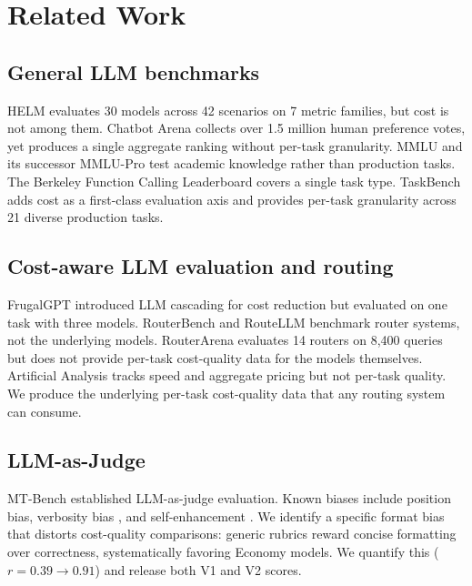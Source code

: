 \documentclass[11pt]{article}
\begin{document}
\section{Related Work}

\subsection{General LLM benchmarks}

HELM \citep{liang2023helm} evaluates 30 models across 42 scenarios on
7 metric families, but cost is not among them.  Chatbot Arena
\citep{chiang2024chatbot} collects over 1.5 million human preference
votes, yet produces a single aggregate ranking without per-task
granularity.  MMLU \citep{hendrycks2021mmlu} and its successor MMLU-Pro
test academic knowledge rather than production tasks.  The Berkeley
Function Calling Leaderboard covers a single task type.  TaskBench adds
cost as a first-class evaluation axis and provides per-task granularity
across 21 diverse production tasks.

\subsection{Cost-aware LLM evaluation and routing}

FrugalGPT \citep{chen2023frugalgpt} introduced LLM cascading for cost
reduction but evaluated on one task with three models.  RouterBench and
RouteLLM benchmark router systems, not the underlying models.
RouterArena \citep{lu2025routerarena} evaluates 14 routers on 8{,}400
queries but does not provide per-task cost-quality data for the models
themselves.  Artificial Analysis tracks speed and aggregate pricing but
not per-task quality.  We produce the underlying per-task cost-quality
data that any routing system can consume.

\subsection{LLM-as-Judge}

MT-Bench \citep{zheng2023judging} established LLM-as-judge evaluation.
Known biases include position bias, verbosity bias
\citep{saito2023verbosity}, and self-enhancement
\citep{panickssery2024llm}.  We identify a specific format bias that
distorts cost-quality comparisons: generic rubrics reward concise
formatting over correctness, systematically favoring Economy models.  We
quantify this ($r = 0.39 \to 0.91$) and release both V1 and V2 scores.
\end{document}
